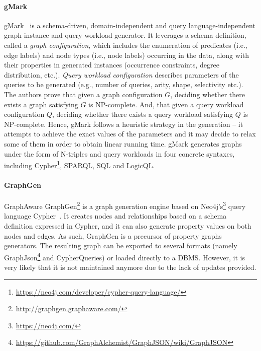 \paragraph{gMark}  gMark~\cite{gMark} is a schema-driven, domain-independent and query language-independent graph instance and query workload generator.  It leverages a schema definition,
called a \emph{graph configuration}, which includes the enumeration of predicates (i.e., edge labels) and node types (i.e., node labels) occurring in the data, along with their properties in generated instances (occurrence constraints, degree distribution, etc.). \emph{Query workload configuration}  describes parameters of the queries to be generated (e.g., number of queries, arity, shape, selectivity etc.). The authors prove that given a graph configuration $G$, deciding whether there exists a graph satisfying $G$ is NP-complete. And, that given a query workload configuration $Q$, deciding
whether there exists a query workload satisfying $Q$ is NP-complete. Hence, gMark follows a heuristic strategy in the generation -- it attempts to achieve the exact values of the parameters and it may decide to relax some of them in order to obtain linear running time. gMark generates graphs under the form of N-triples and query workloads in four concrete syntaxes, including Cypher\footnote{\url{https://neo4j.com/developer/cypher-query-language/}}, SPARQL, SQL and LogicQL.

\paragraph{GraphGen}  GraphAware GraphGen\footnote{\url{http://graphgen.graphaware.com/}} is a graph generation engine based on Neo4j's\footnote{\url{https://neo4j.com/}} query language Cypher~\cite{GraphGen}.  It creates nodes and relationships based on a schema definition expressed in Cypher, and it can also generate property values on both
nodes and edges. As such, GraphGen is a precursor of property graphs generators. The resulting graph can be exported to several formats (namely GraphJson\footnote{\url{https://github.com/GraphAlchemist/GraphJSON/wiki/GraphJSON}} and CypherQueries) or loaded directly to a DBMS. However, it is very likely that it is not maintained anymore due to the lack of updates provided. 